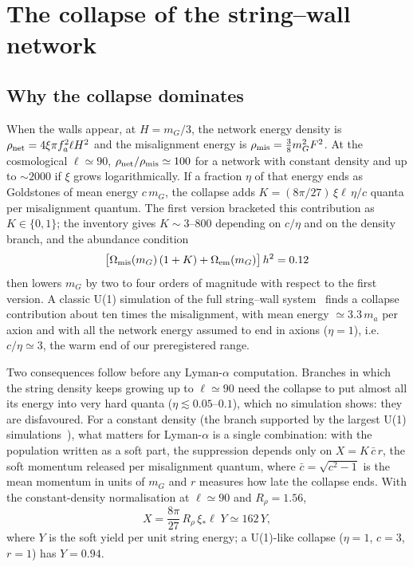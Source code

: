 \documentclass[11pt,a4paper]{article}
\begin{document}
\section{The collapse of the string--wall network}
\label{sec:collapse}

\subsection{Why the collapse dominates}

When the walls appear, at $H=m_G/3$, the network energy density is $\rho_{\rm net}=4\xi\pi f_a^2\ell H^2$ and the misalignment energy is $\rho_{\rm mis}=\tfrac38m_G^2F^2$.
At the cosmological $\ell\simeq90$, $\rho_{\rm net}/\rho_{\rm mis}\simeq100$ for a network with constant density and up to $\sim2000$ if $\xi$ grows logarithmically.
If a fraction $\eta$ of that energy ends as Goldstones of mean energy $c\,m_G$, the collapse adds $K=(8\pi/27)\,\xi\ell\,\eta/c$ quanta per misalignment quantum.
The first version bracketed this contribution as $K\in\{0,1\}$; the inventory gives $K\sim3$--$800$ depending on $c/\eta$ and on the density branch, and the abundance condition
\begin{equation}
\big[\Omega_{\rm mis}(m_G)\,(1+K) + \Omega_{\rm em}(m_G)\big]\,h^2 = 0.12
\end{equation}
then lowers $m_G$ by two to four orders of magnitude with respect to the first version.
A classic U(1) simulation of the full string--wall system~\cite{Hiramatsu2012} finds a collapse contribution about ten times the misalignment, with mean energy $\simeq3.3\,m_a$ per axion and with all the network energy assumed to end in axions ($\eta=1$), i.e.\ $c/\eta\simeq3$, the warm end of our preregistered range.

Two consequences follow before any Lyman-$\alpha$ computation.
Branches in which the string density keeps growing up to $\ell\simeq90$ need the collapse to put almost all its energy into very hard quanta ($\eta\lesssim0.05$--$0.1$), which no simulation shows: they are disfavoured.
For a constant density (the branch supported by the largest U(1) simulations~\cite{Correia2025spectrum,Correia2024terasite}), what matters for Lyman-$\alpha$ is a single combination: with the population written as a soft part, the suppression depends only on $X=K\,\bar c\,r$, the soft momentum released per misalignment quantum, where $\bar c=\sqrt{c^2-1}$ is the mean momentum in units of $m_G$ and $r$ measures how late the collapse ends.
With the constant-density normalisation at $\ell\simeq90$ and $R_\rho=1.56$,
\begin{equation}
X = \frac{8\pi}{27}\,R_\rho\,\xi_*\ell\;Y \simeq 162\,Y ,
\end{equation}
where $Y$ is the soft yield per unit string energy; a U(1)-like collapse ($\eta=1$, $c=3$, $r=1$) has $Y=0.94$.
\end{document}
